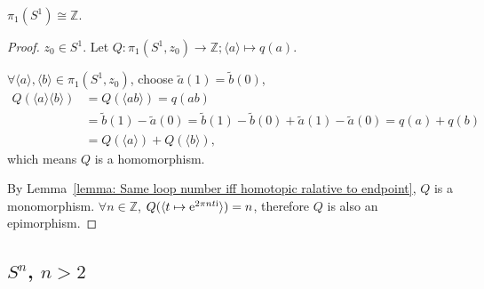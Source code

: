 \documentclass[openany, oneside, a5paper]{book}
\newcommand*{\pclass}[1]{\langle{#1}\rangle}    %
\begin{document}
\begin{theorem}\label{theorem: fundamental group of S^1 is Z}
    $\pi_1(S^1) \cong \mathbb Z$.
\end{theorem}
\begin{proof}
    $z_0 \in S^1$.
    Let $Q \colon \pi_1(S^1, z_0) \to \mathbb Z; \pclass{a} \mapsto q(a)$.

    $\forall \pclass{a}, \pclass{b} \in \pi_1(S^1, z_0)$, choose $\tilde a(1) = \tilde b(0)$,
    \begin{align*}
        Q(\pclass{a} \pclass{b}) &= Q(\langle a b \rangle) 
        = q(ab) \\
        &= \tilde b(1) - \tilde a(0) = \tilde b(1) - \tilde b(0) + \tilde a(1) - \tilde a(0) = q(a) + q(b) \\
        &= Q(\pclass{a}) + Q(\pclass{b}),
    \end{align*}
    which means $Q$ is a homomorphism. 

    By Lemma~\ref{lemma: Same loop number iff homotopic ralative to endpoint}, $Q$ is a monomorphism. 
    $\forall n \in \mathbb Z$, $Q(\langle t \mapsto \mathrm{e}^{2\pi n t\mathrm{i}}\rangle) = n$, therefore $Q$ is also an epimorphism.
\end{proof}

\subsection{\texorpdfstring{$S^n$, $n>2$}{Sn, n > 2}}
\end{document}
